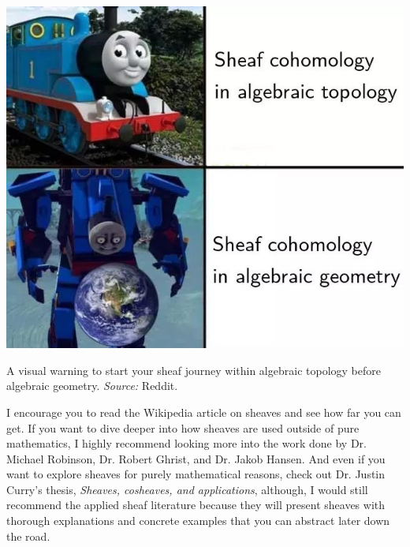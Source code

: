 \documentclass{tufte-handout}
\begin{document}
\begin{marginfigure}%
  \includegraphics[width=\linewidth]{meme.png}
  \caption{A visual warning to start your sheaf journey within algebraic topology before algebraic geometry. \emph{Source:} Reddit.}
  \label{fig:meme}
\end{marginfigure}

I encourage you to read the Wikipedia article%
on sheaves and see how far you can get. If you want to dive deeper into how sheaves are used outside of pure mathematics, I highly recommend looking more into the work done by Dr. Michael Robinson, Dr. Robert Ghrist, and Dr. Jakob Hansen. And even if you want to explore sheaves for purely mathematical reasons, check out Dr. Justin Curry's thesis, \emph{Sheaves, cosheaves, and applications}, although, I would still recommend the applied sheaf literature because they will present sheaves with thorough explanations and concrete examples that you can abstract later down the road. 



\end{document}

